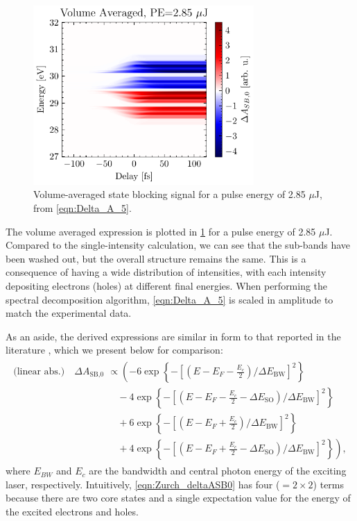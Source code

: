 \begin{figure}
	\centering
	\includegraphics[width=0.75\textwidth]{figures/chap4/dASB0_1430nm_2p85uJ.pdf}
	\caption{Volume-averaged state blocking signal for a pulse energy of 2.85 $\mu$J, from \cref{eqn:Delta_A_5}.}
	\label{fig:dASB0_1430nm_2p85uJ}
\end{figure}

The volume averaged expression is plotted in \cref{fig:dASB0_1430nm_2p85uJ} for a pulse energy of 2.85 $\mu$J. Compared to the single-intensity calculation, we can see that the sub-bands have been washed out, but the overall structure remains the same. This is a consequence of having a wide distribution of intensities, with each intensity depositing electrons (holes) at different final energies. When performing the spectral decomposition algorithm, \cref{eqn:Delta_A_5} is scaled in amplitude to match the experimental data.

As an aside, the derived expressions are similar in form to that reported in the literature \cite{zurchDirectSimultaneousObservation2017}, which we present below for comparison:
\begin{align}
\label{eqn:Zurch_deltaASB0}
\begin{split}
\textrm{(linear abs.)} \quad \Delta A_{\textrm{SB,0}} &\propto \left( -6 \exp \left\{- \left[ \left(E-E_F-\frac{E_c}{2} \right)/\Delta E_{\textrm{BW}} \right]^2 \right\} \right. \\
	&\quad - 4 \exp \left\{- \left[ \left(E-E_F-\frac{E_c}{2}-\Delta E_{\textrm{SO}} \right)/\Delta E_{\textrm{BW}} \right]^2 \right\} \\
	&\quad + 6 \exp \left\{- \left[ \left(E-E_F+\frac{E_c}{2} \right)/\Delta E_{\textrm{BW}} \right]^2 \right\} \\
	&\left. \quad + 4 \exp \left\{- \left[ \left(E-E_F+\frac{E_c}{2}-\Delta E_{\textrm{SO}} \right)/\Delta E_{\textrm{BW}} \right]^2 \right\} \right),
\end{split}
\end{align}
where $E_{BW}$ and $E_c$ are the bandwidth and central photon energy of the exciting laser, respectively. Intuitively, \cref{eqn:Zurch_deltaASB0} has four ($=2 \times 2$) terms because there are two core states and a single expectation value for the energy of the excited electrons and holes. 

